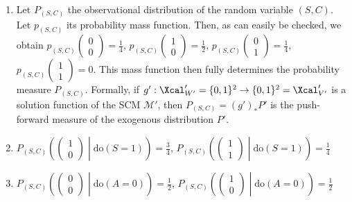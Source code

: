 \begin{enumerate}
\begin{gradedsolution}
\begin{enumerate}
  \begin{equation}
    f' \begin{pmatrix} s \\ c \\ a \\ b \end{pmatrix} = \begin{pmatrix} a \oplus b \\ a \land b \end{pmatrix}.
    \label{eq:probabilistic_case}
  \end{equation}
  \item Let $P_{(S,C)}$ the observational distribution of the random variable $(S,C)$. Let $p_{(S,C)}$ its probability mass function. 
  Then, as can easily be checked, we obtain $p_{(S,C)}\begin{pmatrix} 0 \\ 0 \end{pmatrix} = \frac{1}{4}$, $p_{(S,C)}\begin{pmatrix} 1 \\ 0 \end{pmatrix} = \frac{1}{2}$, $p_{(S,C)}\begin{pmatrix} 0 \\ 1 \end{pmatrix} = \frac{1}{4}$, $p_{(S,C)}\begin{pmatrix} 1 \\ 1 \end{pmatrix} = 0$.
  This mass function then fully determines the probability measure $P_{(S,C)}$.
  Formally, if $g': \Xcal'_{W'} = \{0,1\}^{2} \to \{0,1\}^{2} = \Xcal'_{V'}$ is a solution function of the SCM $\mathcal{M}'$, then $P_{(S,C)} = (g')_*P'$ is the push-forward measure of the exogenous distribution $P'$.
  \item $P_{(S,C)}\left( \begin{pmatrix} 1 \\ 0 \end{pmatrix} \middle| \text{do}(S=1)\right) = \frac{3}{4}$, $P_{(S,C)}\left( \begin{pmatrix} 1 \\ 1 \end{pmatrix} \middle| \text{do}(S=1)\right) = \frac{1}{4}$
  \item $P_{(S,C)}\left( \begin{pmatrix} 0 \\ 0 \end{pmatrix} \middle| \text{do}(A=0)\right) = \frac{1}{2}$,   $P_{(S,C)}\left( \begin{pmatrix} 1 \\ 0 \end{pmatrix} \middle| \text{do}(A=0)\right) = \frac{1}{2}$
\end{enumerate}
\end{gradedsolution}

\end{enumerate}


